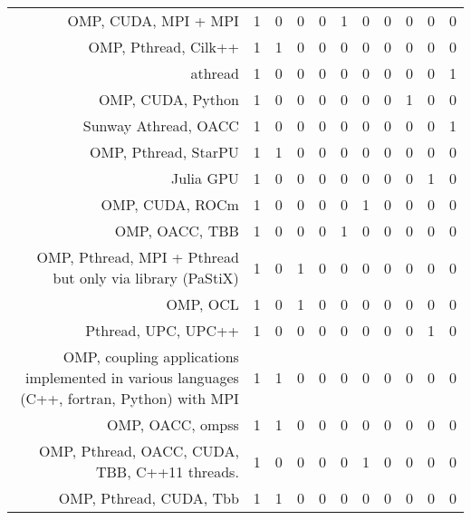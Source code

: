 {\begin{landscape}
\begin{longtable}[htb]{r|c|c|c|c|c|c|c|c|c|c}
{OMP, CUDA, MPI + MPI} & 1 & 0 & 0 & 0 & 1 & 0 & 0 & 0 & 0 & 0 \\%
{OMP, Pthread, Cilk++} & 1 & 1 & 0 & 0 & 0 & 0 & 0 & 0 & 0 & 0 \\%
{athread} & 1 & 0 & 0 & 0 & 0 & 0 & 0 & 0 & 0 & 1 \\%
{OMP, CUDA, Python} & 1 & 0 & 0 & 0 & 0 & 0 & 0 & 1 & 0 & 0 \\%
{Sunway Athread, OACC} & 1 & 0 & 0 & 0 & 0 & 0 & 0 & 0 & 0 & 1 \\%
{OMP, Pthread, StarPU} & 1 & 1 & 0 & 0 & 0 & 0 & 0 & 0 & 0 & 0 \\%
{Julia GPU} & 1 & 0 & 0 & 0 & 0 & 0 & 0 & 0 & 1 & 0 \\%
{OMP, CUDA, ROCm} & 1 & 0 & 0 & 0 & 0 & 1 & 0 & 0 & 0 & 0 \\%
{OMP, OACC, TBB} & 1 & 0 & 0 & 0 & 1 & 0 & 0 & 0 & 0 & 0 \\%
{OMP, Pthread, MPI + Pthread but only via library (PaStiX)} & 1 & 0 & 1 & 0 & 0 & 0 & 0 & 0 & 0 & 0 \\%
{OMP, OCL} & 1 & 0 & 1 & 0 & 0 & 0 & 0 & 0 & 0 & 0 \\%
{Pthread, UPC, UPC++} & 1 & 0 & 0 & 0 & 0 & 0 & 0 & 0 & 1 & 0 \\%
{OMP, coupling applications implemented in various languages (C++, fortran, Python) with MPI} & 1 & 1 & 0 & 0 & 0 & 0 & 0 & 0 & 0 & 0 \\%
{OMP, OACC, ompss} & 1 & 1 & 0 & 0 & 0 & 0 & 0 & 0 & 0 & 0 \\%
{OMP, Pthread, OACC, CUDA, TBB, C++11 threads.} & 1 & 0 & 0 & 0 & 0 & 1 & 0 & 0 & 0 & 0 \\%
{OMP, Pthread, CUDA, Tbb} & 1 & 1 & 0 & 0 & 0 & 0 & 0 & 0 & 0 & 0 \\%
\hline%
\end{longtable}%
\end{landscape}}%
\clearpage%
